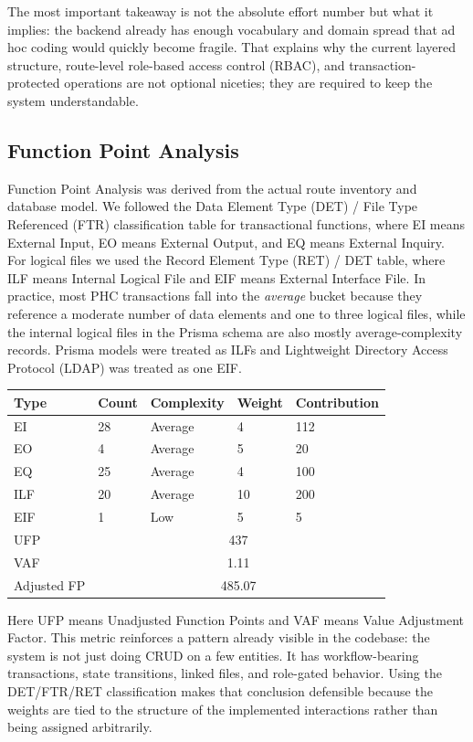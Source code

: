 \documentclass[11pt,a4paper]{article}
\begin{document}
The most important takeaway is not the absolute effort number but what it implies: the backend already has enough vocabulary and domain spread that ad hoc coding would quickly become fragile. That explains why the current layered structure, route-level role-based access control (RBAC), and transaction-protected operations are not optional niceties; they are required to keep the system understandable.

\subsection{Function Point Analysis}
Function Point Analysis was derived from the actual route inventory and database model. We followed the Data Element Type (DET) / File Type Referenced (FTR) classification table for transactional functions, where EI means External Input, EO means External Output, and EQ means External Inquiry. For logical files we used the Record Element Type (RET) / DET table, where ILF means Internal Logical File and EIF means External Interface File. In practice, most PHC transactions fall into the \emph{average} bucket because they reference a moderate number of data elements and one to three logical files, while the internal logical files in the Prisma schema are also mostly average-complexity records. Prisma models were treated as ILFs and Lightweight Directory Access Protocol (LDAP) was treated as one EIF.

\begin{center}
\begin{tabular}{|p{2cm}|p{1.6cm}|p{2cm}|p{1.5cm}|p{2cm}|}
\hline
\rowcolor{SoftBlue}
\textbf{Type} & \textbf{Count} & \textbf{Complexity} & \textbf{Weight} & \textbf{Contribution} \\
\hline
EI & 28 & Average & 4 & 112 \\
EO & 4 & Average & 5 & 20 \\
EQ & 25 & Average & 4 & 100 \\
ILF & 20 & Average & 10 & 200 \\
EIF & 1 & Low & 5 & 5 \\
\hline
UFP & \multicolumn{4}{c|}{437} \\
VAF & \multicolumn{4}{c|}{1.11} \\
Adjusted FP & \multicolumn{4}{c|}{485.07} \\
\hline
\end{tabular}
\end{center}

Here UFP means Unadjusted Function Points and VAF means Value Adjustment Factor. This metric reinforces a pattern already visible in the codebase: the system is not just doing CRUD on a few entities. It has workflow-bearing transactions, state transitions, linked files, and role-gated behavior. Using the DET/FTR/RET classification makes that conclusion defensible because the weights are tied to the structure of the implemented interactions rather than being assigned arbitrarily.
\end{document}
